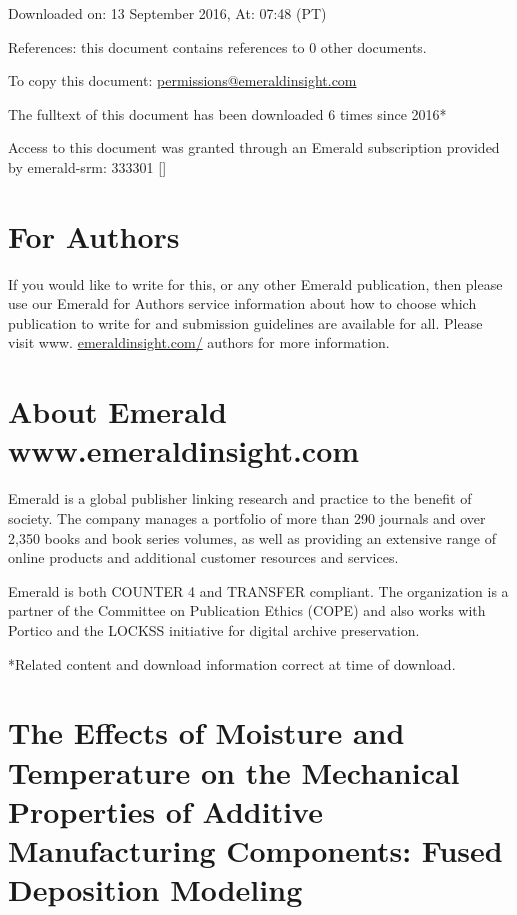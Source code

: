 \documentclass[10pt]{article}
\begin{document}
Downloaded on: 13 September 2016, At: 07:48 (PT)

References: this document contains references to 0 other documents.

To copy this document: \href{mailto:permissions@emeraldinsight.com}{permissions@emeraldinsight.com}

The fulltext of this document has been downloaded 6 times since 2016*

Access to this document was granted through an Emerald subscription provided by emerald-srm: 333301 []

\section*{For Authors}
If you would like to write for this, or any other Emerald publication, then please use our Emerald for Authors service information about how to choose which publication to write for and submission guidelines are available for all. Please visit www. \href{http://emeraldinsight.com/}{emeraldinsight.com/} authors for more information.

\section*{About Emerald www.emeraldinsight.com}
Emerald is a global publisher linking research and practice to the benefit of society. The company manages a portfolio of more than 290 journals and over 2,350 books and book series volumes, as well as providing an extensive range of online products and additional customer resources and services.

Emerald is both COUNTER 4 and TRANSFER compliant. The organization is a partner of the Committee on Publication Ethics (COPE) and also works with Portico and the LOCKSS initiative for digital archive preservation.

*Related content and download information correct at time of download.

\section*{The Effects of Moisture and Temperature on the Mechanical Properties of Additive Manufacturing Components: Fused Deposition Modeling}
\end{document}
